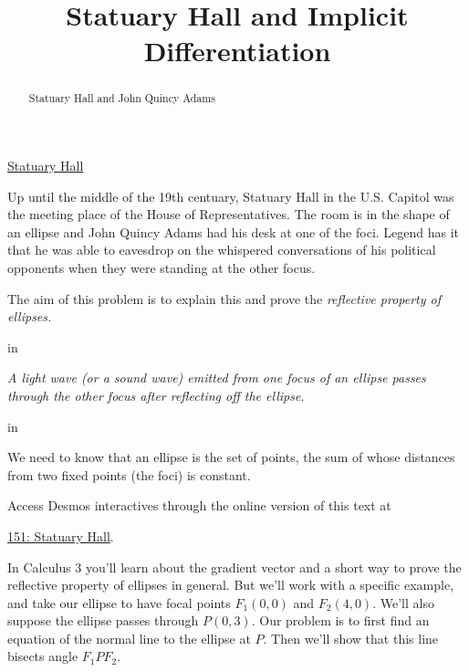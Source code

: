 \documentclass{ximera}
\title{Statuary Hall and Implicit Differentiation}
\newcommand{\pskip}{\vskip 0.1 in}
\begin{document}
\begin{abstract}
Statuary Hall and John Quincy Adams
\end{abstract}
\maketitle


\begin{question}  \label{Q656g5y4546}

\begin{center}
\end{center}

\href{https://www.youtube.com/watch?v=FX6rUU_74kk}{Statuary Hall}


Up until the middle of the 19th centuary, Statuary Hall in the U.S. Capitol was the meeting place of the House of Representatives. The room is in the shape of an ellipse and John Quincy Adams had his desk at one of the foci. Legend has it that he was able to eavesdrop on the whispered conversations of his political opponents when they were standing at the other focus.

The aim of this problem is to explain this and prove the \emph{reflective property of ellipses.}

\pskip

\emph{A light wave (or a sound wave) emitted from one focus of an ellipse passes through the other focus after reflecting off the ellipse.}

\pskip

We need to know that an ellipse is the set of points, the sum of whose distances from two fixed points (the foci) is constant. 

\begin{onlineOnly}
    \begin{center}
\end{center}
\end{onlineOnly}

Access Desmos interactives through the online version of this text at
 
\href{https://https://www.desmos.com/calculator/6kxtojk72r}{151: Statuary Hall}.

In Calculus 3 you'll learn about the gradient vector and a short way to prove the reflective property of ellipses in general. But we'll work with a specific example, and take our ellipse to have focal points $F_1(0,0)$ and $F_2(4,0)$. We'll also suppose the ellipse passes through $P(0,3)$. Our problem is to first find an equation of the normal line to the ellipse at $P$. Then we'll show that this line bisects angle $F_1PF_2$. 


\end{question}
\end{document}
